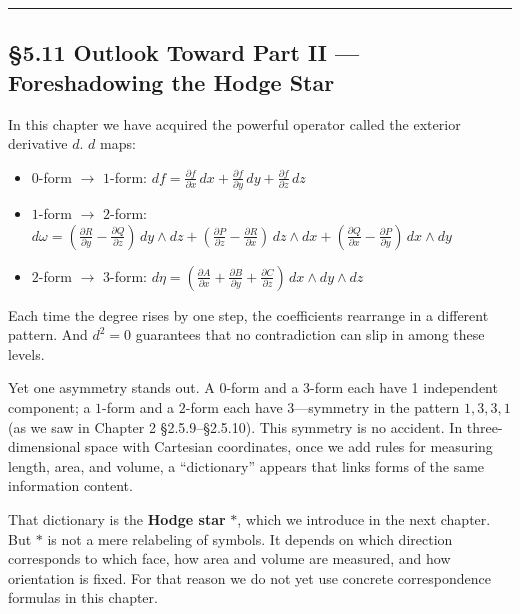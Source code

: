 \begin{center}\rule{0.5\linewidth}{0.5pt}\end{center}

\hypertarget{outlook-toward-part-ii-foreshadowing-the-hodge-star}{%
\subsection{§5.11 Outlook Toward Part II --- Foreshadowing the Hodge
Star}\label{outlook-toward-part-ii-foreshadowing-the-hodge-star}}

In this chapter we have acquired the powerful operator called the
exterior derivative \(d\). \(d\) maps:

\begin{itemize}
\item
  \(0\)-form \(\to\) \(1\)-form:
  \(df = \frac{\partial f}{\partial x}\,dx + \frac{\partial f}{\partial y}\,dy + \frac{\partial f}{\partial z}\,dz\)
\item
  \(1\)-form \(\to\) \(2\)-form:
  \(d\omega = (\frac{\partial R}{\partial y}-\frac{\partial Q}{\partial z})\,dy\wedge dz + (\frac{\partial P}{\partial z}-\frac{\partial R}{\partial x})\,dz\wedge dx + (\frac{\partial Q}{\partial x}-\frac{\partial P}{\partial y})\,dx\wedge dy\)
\item
  \(2\)-form \(\to\) \(3\)-form:
  \(d\eta = (\frac{\partial A}{\partial x}+\frac{\partial B}{\partial y}+\frac{\partial C}{\partial z})\,dx\wedge dy\wedge dz\)
\end{itemize}

Each time the degree rises by one step, the coefficients rearrange in a
different pattern. And \(d^2=0\) guarantees that no contradiction can
slip in among these levels.

Yet one asymmetry stands out. A \(0\)-form and a \(3\)-form each have 1
independent component; a \(1\)-form and a \(2\)-form each have
3---symmetry in the pattern \(1, 3, 3, 1\) (as we saw in Chapter 2
§2.5.9--§2.5.10). This symmetry is no accident. In three-dimensional
space with Cartesian coordinates, once we add rules for measuring
length, area, and volume, a ``dictionary'' appears that links forms of
the same information content.

That dictionary is the \textbf{Hodge star} \(\ast\), which we introduce
in the next chapter. But \(\ast\) is not a mere relabeling of symbols.
It depends on which direction corresponds to which face, how area and
volume are measured, and how orientation is fixed. For that reason we do
not yet use concrete correspondence formulas in this chapter.

